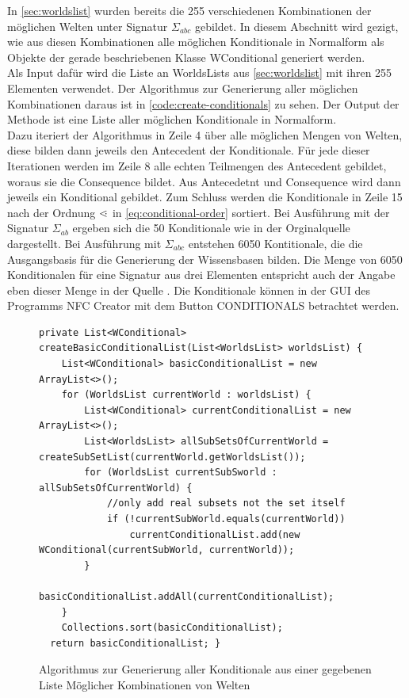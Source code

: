 \documentclass[12pt,a4paper]{article}
\newcommand\dotl{\mathrel{%
    \mathchoice{\QEQ}{\QEQ}{\QEQ}{\QEQ}%
}}
\def\QEQ{{%
    \setbox0\hbox{<}%
    \rlap{\hbox to \wd0{\hss \raisebox {0.1pt}{$\ \cdot$\hss}}}\box0
}}
\begin{document}
In \autoref{sec:worldslist} wurden bereits die 255 verschiedenen Kombinationen der möglichen Welten unter Signatur $\Sigma_{abc}$ gebildet. In diesem Abschnitt wird gezigt, wie aus diesen Kombinationen alle möglichen Konditionale in Normalform als Objekte der gerade beschriebenen Klasse WConditional generiert werden. \\
Als Input dafür wird die Liste an WorldsLists aus \autoref{sec:worldslist} mit ihren 255 Elementen verwendet. Der Algorithmus zur Generierung aller möglichen Kombinationen daraus ist in \autoref{code:create-conditionals} zu sehen. Der Output der Methode ist eine Liste aller möglichen Konditionale in Normalform. \\
Dazu iteriert der Algorithmus in Zeile 4 über alle möglichen Mengen von Welten, diese bilden dann jeweils den Antecedent der Konditionale. Für jede dieser Iterationen werden im Zeile 8 alle echten Teilmengen des Antecedent gebildet, woraus sie die Consequence bildet. Aus Antecedetnt und Consequence wird dann jeweils ein Konditional gebildet. Zum Schluss werden die Konditionale in Zeile 15 nach der Ordnung $\dotl$ in \autoref{eq:conditional-order} sortiert. Bei Ausführung mit der Signatur $\Sigma_{ab}$ ergeben sich die 50 Konditionale wie in der Orginalquelle \cite{beierle19} dargestellt. Bei Ausführung mit $\Sigma_{abc}$ entstehen 6050 Kontitionale, die die Ausgangsbasis für die Generierung der Wissensbasen bilden. Die Menge von 6050 Konditionalen für eine Signatur aus drei Elementen entspricht auch der Angabe eben dieser Menge in  der Quelle \cite{beierle19b}. Die Konditionale können in der GUI des Programms NFC Creator mit dem Button CONDITIONALS betrachtet werden.

\begin{figure}
\begin{lstlisting}
private List<WConditional> createBasicConditionalList(List<WorldsList> worldsList) {
    List<WConditional> basicConditionalList = new ArrayList<>();
    for (WorldsList currentWorld : worldsList) {
        List<WConditional> currentConditionalList = new ArrayList<>();
        List<WorldsList> allSubSetsOfCurrentWorld = createSubSetList(currentWorld.getWorldsList());
        for (WorldsList currentSubSworld : allSubSetsOfCurrentWorld) {
            //only add real subsets not the set itself
            if (!currentSubWorld.equals(currentWorld))
                currentConditionalList.add(new WConditional(currentSubWorld, currentWorld));
        }
        basicConditionalList.addAll(currentConditionalList);
    }
    Collections.sort(basicConditionalList);
  return basicConditionalList; }
\end{lstlisting}
\caption{Algorithmus zur Generierung aller Konditionale aus einer gegebenen Liste Möglicher Kombinationen von Welten}
\label{code:create-conditionals}
\end{figure} 
\end{document}
